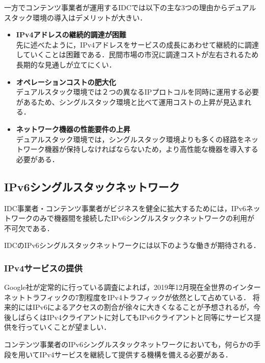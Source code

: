 一方でコンテンツ事業者が運用するIDCでは以下の主な3つの理由からデュアルスタック環境の導入はデメリットが大きい．

\begin{itemize}
    \item \textbf{IPv4アドレスの継続的調達が困難} \\
    先に述べたように，IPv4アドレスをサービスの成長にあわせて継続的に調達していくことは困難である．民間市場の市況に調達コストが左右されるため長期的な見通しが立てにくい．
    \item \textbf{オペレーションコストの肥大化}\\
デュアルスタック環境では２つの異なるIPプロトコルを同時に運用する必要があるため、シングルスタック環境と比べて運用コストの上昇が見込まれる\cite{北口善明2017クライアント}．
    \item \textbf{ネットワーク機器の性能要件の上昇}\\
デュアルスタック環境では，シングルスタック環境よりも多くの経路をネットワーク機器が保持しなければならないため，より高性能な機器を導入する必要がある．
\end{itemize}



\subsection{IPv6シングルスタックネットワーク}
\label{introduction:background:IPv6-single-stack-network}
IDC事業者・コンテンツ事業者がビジネスを健全に拡大するためには，IPv6ネットワークのみで機器間を接続したIPv6シングルスタックネットワークの利用が不可欠である．

IDCのIPv6シングルスタックネットワークには以下のような働きが期待される．


\subsubsection{IPv4サービスの提供}
\label{introduction:background:IPv6-single-stack-network:ipv4-service}
Google社が定常的に行っている調査\cite{Google_IPv6_statistics}によれば，2019年12月現在全世界のインターネットトラフィックの7割程度をIPv4トラフィックが依然として占めている．
将来的にはIPv6によるアクセスの割合が徐々に大きくなることが予想されるが，今後しばらくはIPv4クライアントに対してもIPv6クライアントと同等にサービス提供を行っていくことが望ましい．

コンテンツ事業者のIPv6シングルスタックネットワークにおいても，何らかの手段を用いてIPv4サービスを継続して提供する機構を備える必要がある．

